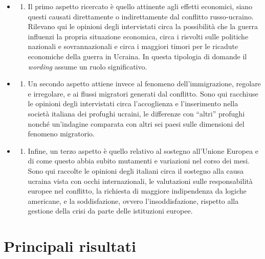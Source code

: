 \documentclass[
]{book}
\providecommand{\tightlist}{%
  \setlength{\itemsep}{0pt}\setlength{\parskip}{0pt}}
\begin{document}
\begin{itemize}
\item
  \begin{enumerate}
  \def\labelenumi{\alph{enumi})}
  \tightlist
  \item
    Il primo aspetto ricercato è quello attinente agli effetti economici, siano questi causati direttamente o indirettamente dal conflitto russo-ucraino. Rilevano qui le opinioni degli intervistati circa la possibilità che la guerra influenzi la propria situazione economica, circa i risvolti sulle politiche nazionali e sovrannazionali e circa i maggiori timori per le ricadute economiche della guerra in Ucraina.
    In questa tipologia di domande il \emph{wording} assume un ruolo significativo.
  \end{enumerate}
\item
  \begin{enumerate}
  \def\labelenumi{\alph{enumi})}
  \setcounter{enumi}{1}
  \tightlist
  \item
    Un secondo aspetto attiene invece al fenomeno dell'immigrazione, regolare e irregolare, e ai flussi migratori generati dal conflitto. Sono qui racchiuse le opinioni degli intervistati circa l'accoglienza e l'inserimento nella società italiana dei profughi ucraini, le differenze con ``altri'' profughi nonché un'indagine comparata con altri sei paesi sulle dimensioni del fenomeno migratorio.
  \end{enumerate}
\item
  \begin{enumerate}
  \def\labelenumi{\alph{enumi})}
  \setcounter{enumi}{2}
  \tightlist
  \item
    Infine, un terzo aspetto è quello relativo al sostegno all'Unione Europea e di come questo abbia subito mutamenti e variazioni nel corso dei mesi. Sono qui raccolte le opinioni degli italiani circa il sostegno alla causa ucraina vista con occhi internazionali, le valutazioni sulle responsabilità europee nel conflitto, la richiesta di maggiore indipendenza da logiche americane, e la soddisfazione, ovvero l'insoddisfazione, rispetto alla gestione della crisi da parte delle istituzioni europee.
  \end{enumerate}
\end{itemize}

\hypertarget{principali-risultati-4}{%
\section{Principali risultati}\label{principali-risultati-4}}
\end{document}
